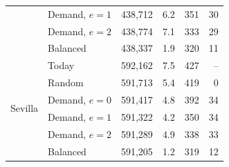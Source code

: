 \begin{table}[htbp]
{\begin{tabular}{llrrrr}
 & Demand, $e = 1$ & 438,712 & 6.2 & 351 & 30 \\
 & Demand, $e = 2$ & 438,774 & 7.1 & 333 & 29 \\
 & Balanced & 438,337 & 1.9 & 320 & 11 \\
\midrule
\multirow{6}{*}{Sevilla} & Today & 592,162 & 7.5 & 427 & -- \\
 & Random & 591,713 & 5.4 & 419 & 0 \\
 & Demand, $e = 0$ & 591,417 & 4.8 & 392 & 34 \\
 & Demand, $e = 1$ & 591,322 & 4.2 & 350 & 34 \\
 & Demand, $e = 2$ & 591,289 & 4.9 & 338 & 33 \\
 & Balanced & 591,205 & 1.2 & 319 & 12 \\
\bottomrule
\end{tabular}}
\end{table}
